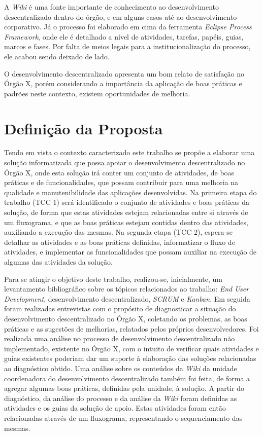 A \textit{Wiki} é uma fonte importante de conhecimento ao desenvolvimento descentralizado dentro do órgão, e em alguns casos até ao desenvolvimento corporativo. Já o processo foi elaborado em cima da ferramenta \textit{Eclipse Process Framework}, onde ele é detalhado a nível de atividades, tarefas, papéis, guias, marcos e fases. Por falta de meios legais para a institucionalização do processo, ele acabou sendo deixado de lado.

O desenvolvimento descentralizado apresenta um bom relato de satisfação no Órgão X, porém considerando a importância da aplicação de boas práticas e padrões neste contexto, existem oportunidades de melhoria.

\section{Definição da Proposta}

Tendo em vista o contexto caracterizado este trabalho se propõe a elaborar uma solução informatizada que possa apoiar o desenvolvimento descentralizado no Órgão X, onde esta solução irá conter um conjunto de atividades, de boas práticas e de funcionalidades, que possam contribuir para uma melhoria na qualidade e manutenibilidade das aplicações desenvolvidas. Na primeira etapa do trabalho (TCC 1) será identificado o conjunto de atividades e boas práticas da solução, de forma que estas atividades estejam relacionadas entre si através de um fluxograma, e que as boas práticas estejam contidas dentro das atividades, auxiliando a execução das mesmas. Na segunda etapa (TCC 2), espera-se detalhar as atividades e as boas práticas definidas, informatizar o fluxo de atividades, e implementar as funcionalidades que possam auxiliar na execução de algumas das atividades da solução.

Para se atingir o objetivo deste trabalho, realizou-se, inicialmente, um levantamento bibliográfico sobre os tópicos relacionados ao trabalho: \textit{End User Development}, desenvolvimento descentralizado, \textit{SCRUM} e \textit{Kanban}. Em seguida foram realizadas entrevistas com o propósito de diagnosticar a situação do desenvolvimento descentralizado no Órgão X, coletando os problemas, as boas práticas e as sugestões de melhorias, relatados pelos próprios desenvolvedores. Foi realizada uma análise no processo de desenvolvimento descentralizado não implementado, existente no Órgão X, com o intuito de verificar quais atividades e guias existentes poderiam dar um suporte à elaboração das soluções relacionadas ao diagnóstico obtido. Uma análise sobre os conteúdos da \textit{Wiki} da unidade coordenadora do desenvolvimento descentralizado também foi feita, de forma a agregar algumas boas práticas, definidas pela unidade, à solução. A partir do diagnóstico, da análise do processo e da análise da \textit{Wiki} foram definidas as atividades e os guias da solução de apoio. Estas atividades foram então relacionadas através de um fluxograma, representando o sequenciamento das mesmas.

